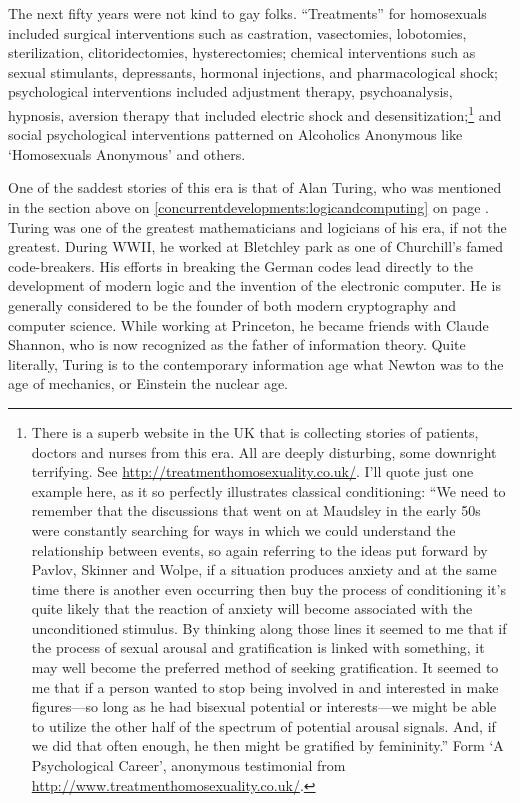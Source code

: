 \begin{refsection}
The next fifty years were not kind to gay folks. “Treatments” for homosexuals included surgical interventions such as castration, vasectomies, lobotomies, sterilization, clitoridectomies, hysterectomies; chemical interventions such as sexual stimulants, depressants, hormonal injections, and pharmacological shock; psychological interventions included adjustment therapy, psychoanalysis, hypnosis, aversion therapy that included electric shock and desensitization;\footnote{There is a superb website in the UK that is collecting stories of patients, doctors and nurses from this era. All are deeply disturbing, some downright terrifying. See \url{http://treatmenthomosexuality.co.uk/}. I'll quote just one example here, as it so perfectly illustrates classical conditioning:
“We need to remember that the discussions that went on at Maudsley in the early 50s were constantly searching for ways in which we could understand the relationship between events, so again referring to the ideas put forward by Pavlov, Skinner and Wolpe, if a situation produces anxiety and at the same time there is another even occurring then buy the process of conditioning it's quite likely that the reaction of anxiety will become associated with the unconditioned stimulus. By thinking along those lines it seemed to me that if the process of sexual arousal and gratification is linked with something, it may well become the preferred method of seeking gratification. It seemed to me that if a person wanted to stop being involved in and interested in make figures—so long as he had bisexual potential or interests—we might be able to utilize the other half of the spectrum of potential arousal signals. And, if we did that often enough, he then might be gratified by femininity.”
Form `A Psychological Career', anonymous testimonial from \url{http://www.treatmenthomosexuality.co.uk/}.} and social psychological interventions patterned on Alcoholics Anonymous like `Homosexuals Anonymous' and others.

One of the saddest stories of this era is that of Alan Turing, who was mentioned in the section above on \ref{concurrentdevelopments:logicandcomputing} on page \pageref{concurrentdevelopments:logicandcomputing}. Turing was one of the greatest mathematicians and logicians of his era, if not the greatest. During WWII, he worked at Bletchley park as one of Churchill's famed code-breakers. His efforts in breaking the German codes lead directly to the development of modern logic and the invention of the electronic computer. He is generally considered to be the founder of both modern cryptography and computer science. While working at Princeton, he became friends with Claude Shannon, who is now recognized as the father of information theory. Quite literally, Turing is to the contemporary information age what Newton was to the age of mechanics, or Einstein the nuclear age.


\end{refsection}
